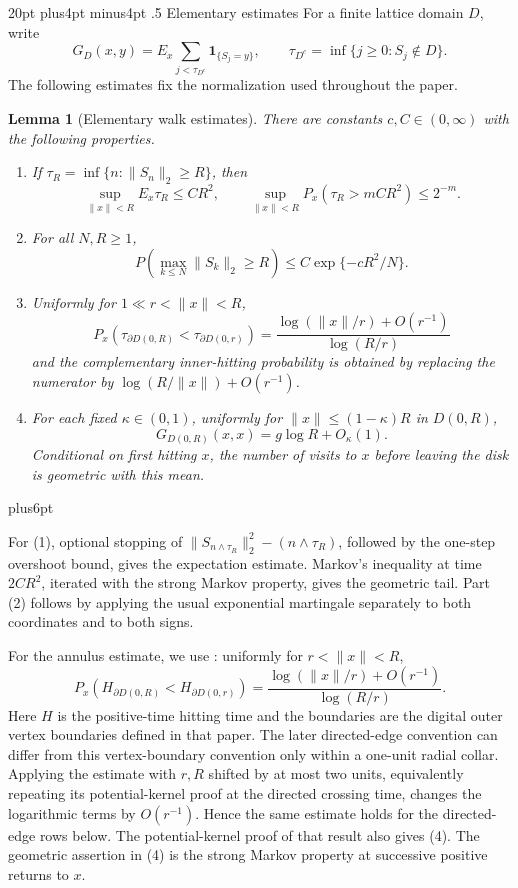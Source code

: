 \documentclass[12pt,reqno]{amsart}
\makeatletter
\def\section{\@startsection{section}{1}{0pt}%
  {20pt plus4pt minus4pt}
  {.5\linespacing}
  {\normalfont\bfseries}}
\theoremstyle{plain}
\newtheorem{lemma}[theorem]{Lemma}
\theoremstyle{definition}
\theoremstyle{remark}
\renewenvironment{proof}[1][\proofname]{%
  \par
  \pushQED{\qed}%
  \normalfont
  \topsep6pt plus6pt\relax
  \trivlist
  \item[\hskip\labelsep\slshape #1\@addpunct{.}]%
  \ignorespaces
}{%
  \popQED
  \endtrivlist
  \@endpefalse
}
\DeclareRobustCommand{\qed}{%
  \leavevmode\unskip\penalty9999\hbox{}\nobreak
  \ifmmode
    \makebox[0pt][l]{\qquad\hbox{\qedsymbol}}%
  \else
    \qquad\hbox{\qedsymbol}%
  \fi
}
\renewcommand{\qedsymbol}{\rule[.47pt]{4pt}{6pt}}
\numberwithin{equation}{section}
\makeatother
\begin{document}
\section{Elementary estimates}\label{sec:elementary}
For a finite lattice domain $D$, write
\[
 G_D(x,y)=E_x\sum_{j<\tau_{D^c}}\mathbf1_{\{S_j=y\}},
 \qquad \tau_{D^c}=\inf\{j\ge0:S_j\notin D\}.
\]
The following estimates fix the normalization used throughout the paper.
\begin{lemma}[Elementary walk estimates]\label{lem:elementary-walk-estimates}
There are constants \(c,C\in(0,\infty)\) with the following properties.

\begin{enumerate}\item If \(\tau_R=\inf\{n:\lVert S_n\rVert_2\ge R\}\), then
   \[
       \sup_{\lVert x\rVert<R}E_x\tau_R\le C R^2,\qquad
       \sup_{\lVert x\rVert<R}P_x(\tau_R>mCR^2)\le 2^{-m}.
   \]
\item For all \(N,R\ge1\),
   \[
       P\left(\max_{k\le N}\lVert S_k\rVert_2\ge R\right)
       \le C\exp\{-cR^2/N\}.
   \]
\item Uniformly for \(1\ll r<\lVert x\rVert<R\),
   \[
   P_x(\tau_{\partial D(0,R)}<\tau_{\partial D(0,r)})
     =\frac{\log(\lVert x\rVert/r)+O(r^{-1})}{\log(R/r)}
   \]
   and the complementary inner-hitting probability is obtained by replacing
   the numerator by \(\log(R/\lVert x\rVert)+O(r^{-1})\).
\item For each fixed $\kappa\in(0,1)$, uniformly for $\|x\|\le(1-\kappa)R$ in
   \(D(0,R)\),
   \[
       G_{D(0,R)}(x,x)=g\log R+O_\kappa(1).
   \]
   Conditional on first hitting \(x\), the number of visits to \(x\) before
   leaving the disk is geometric with this mean.
\end{enumerate}
\end{lemma}

\begin{proof}
For (1), optional stopping of
\(\lVert S_{n\wedge\tau_R}\rVert_2^2-(n\wedge\tau_R)\), followed by the
one-step overshoot bound, gives the expectation estimate.  Markov's
inequality at time \(2CR^2\), iterated with the strong Markov property,
gives the geometric tail.  Part (2) follows by applying the usual
exponential martingale separately to both coordinates and to both signs.

For the annulus estimate, we use \cite[Lemma~2.1, (2.5)]{HLOZ2025}:
uniformly for $r<\|x\|<R$,
\[
 P_x(H_{\partial D(0,R)}<H_{\partial D(0,r)})
 =\frac{\log(\|x\|/r)+O(r^{-1})}{\log(R/r)}.
\]
Here \(H\) is the positive-time hitting time and the boundaries are the
digital outer vertex boundaries defined in that paper.  The later
directed-edge convention can differ from this vertex-boundary convention
only within a one-unit radial collar.  Applying the estimate with \(r,R\)
shifted by at most two units, equivalently repeating its potential-kernel
proof at the directed crossing time, changes the logarithmic terms by
\(O(r^{-1})\).  Hence the same estimate holds for the directed-edge rows
below.  The potential-kernel proof of that result also gives (4).  The
geometric assertion in (4) is the strong Markov
property at successive positive returns to \(x\).
\end{proof}
\end{document}
